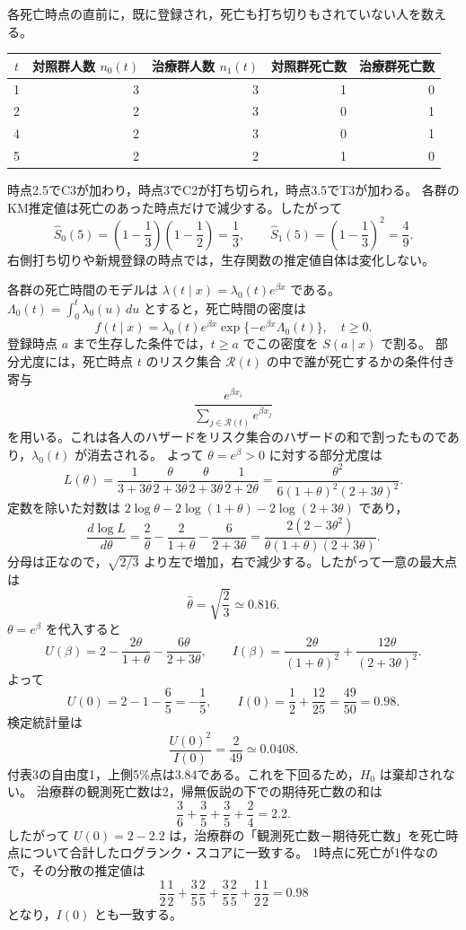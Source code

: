 \documentclass[a4paper,11pt]{ltjsarticle}
\begin{document}
\setlength{\abovedisplayskip}{7pt}
\setlength{\belowdisplayskip}{7pt}

各死亡時点の直前に，既に登録され，死亡も打ち切りもされていない人を数える。
\begin{center}
\begin{tabular}{crrrr}
\toprule
$t$ & 対照群人数 $n_0(t)$ & 治療群人数 $n_1(t)$ & 対照群死亡数 & 治療群死亡数\\
\midrule
1 & 3 & 3 & 1 & 0\\
2 & 2 & 3 & 0 & 1\\
4 & 2 & 3 & 0 & 1\\
5 & 2 & 2 & 1 & 0\\
\bottomrule
\end{tabular}
\end{center}
時点2.5でC3が加わり，時点3でC2が打ち切られ，時点3.5でT3が加わる。
各群のKM推定値は死亡のあった時点だけで減少する。したがって
\[
\hat S_0(5)=\left(1-\frac13\right)\left(1-\frac12\right)=\boxed{\frac13},\qquad
\hat S_1(5)=\left(1-\frac13\right)^2=\boxed{\frac49}.
\]
右側打ち切りや新規登録の時点では，生存関数の推定値自体は変化しない。

各群の死亡時間のモデルは $\lambda(t\mid x)=\lambda_0(t)e^{\beta x}$ である。
$\Lambda_0(t)=\int_0^t\lambda_0(u)\,du$ とすると，死亡時間の密度は
\[
f(t\mid x)=\lambda_0(t)e^{\beta x}\exp\{-e^{\beta x}\Lambda_0(t)\},\quad t\geq0.
\]
登録時点 $a$ まで生存した条件では，$t\geq a$ でこの密度を $S(a\mid x)$ で割る。
部分尤度には，死亡時点 $t$ のリスク集合 $\mathcal R(t)$ の中で誰が死亡するかの条件付き寄与
\[
\frac{e^{\beta x_i}}{\sum_{j\in\mathcal R(t)}e^{\beta x_j}}
\]
を用いる。これは各人のハザードをリスク集合のハザードの和で割ったものであり，$\lambda_0(t)$ が消去される。
よって $\theta=e^\beta>0$ に対する部分尤度は
\[
L(\theta)=\frac1{3+3\theta}\frac{\theta}{2+3\theta}
\frac{\theta}{2+3\theta}\frac1{2+2\theta}
=\frac{\theta^2}{6(1+\theta)^2(2+3\theta)^2}.
\]
定数を除いた対数は $2\log\theta-2\log(1+\theta)-2\log(2+3\theta)$ であり，
\[
\frac{d\log L}{d\theta}
=\frac2\theta-\frac2{1+\theta}-\frac6{2+3\theta}
=\frac{2(2-3\theta^2)}{\theta(1+\theta)(2+3\theta)}.
\]
分母は正なので，$\sqrt{2/3}$ より左で増加，右で減少する。したがって一意の最大点は
\[
\boxed{\hat\theta=\sqrt{\frac23}\simeq0.816}.
\]
\newpage
{}
$\theta=e^\beta$ を代入すると
\[
U(\beta)=2-\frac{2\theta}{1+\theta}-\frac{6\theta}{2+3\theta},\qquad
I(\beta)=\frac{2\theta}{(1+\theta)^2}+\frac{12\theta}{(2+3\theta)^2}.
\]
よって
\[
U(0)=2-1-\frac65=-\frac15,\qquad
I(0)=\frac12+\frac{12}{25}=\frac{49}{50}=0.98.
\]
検定統計量は
\[
\frac{U(0)^2}{I(0)}=\frac{2}{49}\simeq0.0408.
\]
付表3の自由度1，上側5\%点は3.84である。これを下回るため，$H_0$ は棄却されない。
治療群の観測死亡数は2，帰無仮説の下での期待死亡数の和は
\[
\frac36+\frac35+\frac35+\frac24=2.2.
\]
したがって $U(0)=2-2.2$ は，治療群の「観測死亡数－期待死亡数」を死亡時点について合計したログランク・スコアに一致する。
1時点に死亡が1件なので，その分散の推定値は
\[
\frac12\frac12+\frac35\frac25+\frac35\frac25+\frac12\frac12=0.98
\]
となり，$I(0)$ とも一致する。
\end{document}
